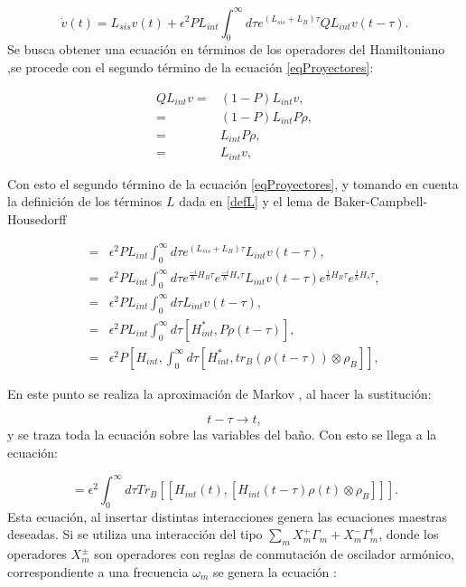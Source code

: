 \documentclass[a4paper,10pt]{report}
\begin{document}
\begin{equation}\label{eqProyectores}
\dot{v}(t)=L_{sis}v(t) + \epsilon^2 PL_{int} \int_{0}^{\infty}d\tau e^{(L_{sis}+L_{B})\tau}QL_{int}v(t-\tau).
\end{equation} Se busca obtener una ecuación en términos de los operadores del Hamiltoniano \cite{ZollerQN},se procede con el segundo término de la ecuación \eqref{eqProyectores}:

\begin{align*}
QL_{int}v=&(1-P)L_{int}v,\\
=& (1-P)L_{int}P\rho, \\
=& L_{int}P\rho, \\
=& L_{int}v,
\end{align*}

Con esto el segundo término de la ecuación \eqref{eqProyectores}, y tomando en cuenta la definición de los términos $L$ dada en \eqref{defL} y el lema de Baker-Campbell-Housedorff \cite{SakuraiQM}

\begin{align*}
=& \epsilon^2 PL_{int} \int_{0}^{\infty}d\tau e^{(L_{sis}+L_{B})\tau}L_{int}v(t-\tau),\\
=& \epsilon^2 PL_{int} \int_{0}^{\infty}d\tau e^{\frac{-i}{\hbar}H_B\tau}e^{\frac{-i}{\hbar}H_s\tau}L_{int}v(t-\tau)e^{\frac{i}{\hbar}H_B\tau}e^{\frac{i}{\hbar}H_s\tau},\\
=&\epsilon^2 PL_{int} \int_{0}^{\infty}d\tau L_{int}v(t-\tau), \\
=&\epsilon^2 PL_{int} \int_{0}^{\infty}d\tau[H_{int}^*,P\rho(t-\tau)], \\
=&\epsilon^2 P[H_{int},\int_{0}^{\infty}d\tau[H_{int}^*,tr_B(\rho(t-\tau))\otimes\rho_B]],
\end{align*}

En este punto se realiza la aproximación de Markov \cite{ZollerQN}, al hacer la sustitución:

\begin{equation}
t-\tau \rightarrow t,
\end{equation} y se traza toda la ecuación sobre las variables del baño. Con esto se llega a la ecuación:

\begin{equation}
=\epsilon^2 \int_{0}^{\infty}d\tau Tr_B[[H_{int}(t),[H_{int}(t-\tau)\rho(t)\otimes\rho_B]]].
\end{equation} Esta ecuación, al insertar distintas interacciones genera las ecuaciones maestras deseadas. Si se utiliza una interacción del tipo $\sum_m X^+_m\Gamma_m + X^-_m\Gamma^\dagger_m$, donde los operadores $X_m^\pm$ son operadores con reglas de conmutación de oscilador armónico, correspondiente a una frecuencia $\omega_m$ se genera la ecuación \cite{ZollerQN}:
\end{document}

